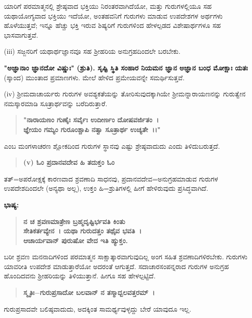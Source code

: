 ಯಾರಿಗೆ ಪರಮಾತ್ಮನಲ್ಲಿ ಶ್ರೇಷ್ಠವಾದ ಭಕ್ತಿಯು ನಿರಂತರವಾಗಿದೆಯೋ, ಮತ್ತು ಗುರುಗಳಲ್ಲಿಯೂ ಸಹ ಯಥಾಯೋಗ್ಯವಾದ ಭಕ್ತಿಯು ಇದೆಯೋ, ಅಂತಹವನಿಗೆ ಗುರುಗಳು ಮಾಡುವ ಉಪದೇಶಗಳ ಅರ್ಥಗಳು ಹೊಳೆಯುತ್ತವೆ; ಇನ್ನೂ ಹೆಚ್ಚು ಭಕ್ತಿ ಇರುವ ಶಿಷ್ಯರಿಗೆ ಗುರುಗಳಿಂದ ಹೇಳಲ್ಪಡದ ವಿಶೇಷಾರ್ಥಗಳೂ ಸಹ ಭಾಸವಾಗುತ್ತವೆ.

(iii) ಸಜ್ಜನರಿಗೆ ಯಥಾರ್ಥಜ್ಞಾನವೂ ಸಹ ಶ‍್ರೀಹರಿಯ ಅನುಗ್ರಹದಿಂದಲೇ ಬರಬೇಕು.

\textbf{"ಅಜ್ಞಾನಾಂ ಜ್ಞಾನದೋ ವಿಷ್ಣುಃ" (ಶ್ರುತಿ). ಸೃಷ್ಟಿ ಸ್ಥಿತಿ ಸಂಹಾರ ನಿಯಮನ ಜ್ಞಾನ ಅಜ್ಞಾನ ಬಂಧ ಮೋಕ್ಷಾಃ ಯತಃ} (ಸ್ಕಾಂದ) ಮುಂತಾದ ಪ್ರಮಾಣಗಳು. ಮೇಲೆ ಹೇಳಿದ ಪ್ರಮೇಯವನ್ನೇ ಸಮರ್ಥಿಸುತ್ತವೆ.

(iv) ಶ‍್ರೀಮದಾಚಾರ್ಯರು ಗುರುಗಳ ಅವಶ್ಯಕತೆಯನ್ನು ತೋರಿಸುವುದಕ್ಕಾಗಿಯೇ ಶ‍್ರೀಮನ್ನಾರಾಯಣನನ್ನು ಗುರುತ್ವೇನ ನಮಸ್ಕಾರಮಾಡಿ ಸೂತ್ರಾರ್ಥವನ್ನು ಬರೆದಿರುತ್ತಾರೆ.

\begin{verse}
\textbf{"ನಾರಾಯಣಂ ಗುಣೈಃ ಸರ್ವೈಃ ಉದೀರ್ಣಂ ದೋಷವರ್ಜಿತಂ~।}\\\textbf{ಜ್ಞೇಯಂ ಗಮ್ಯಂ ಗುರೂಂಶ್ಚಾಪಿ ನತ್ವಾ ಸೂತ್ರಾರ್ಥ ಉಚ್ಯತೇ~।।"}
\end{verse}

\noindent
ಎಂಬ ಮಂಗಳಾಚರಣ ಶ್ಲೋಕದಿಂದ ಗುರುಗಳ ಸ್ಥಾನವು ಎಷ್ಟು ಶ್ರೇಷ್ಠವಾದುದು ಎಂದು ತಿಳಿದುಬರುತ್ತದೆ.

\begin{verse}
\textbf{(v) ಓಂ ಪ್ರದಾನವದೇವ ಹಿ ತದುಕ್ತಂ ಓಂ}
\end{verse}

ತತ್=ಅಪರೋಕ್ಷಕ್ಕೆ ಕಾರಣವಾದ ಶ್ರವಣಾದಿ ಸಾಧನವು, ಪ್ರದಾನವದೇವ=ಅನುಗ್ರಹ\-ಮಾಡುವ ಗುರುಗಳ ಉಪದೇಶದಿಂದಲೇ (ಅನ್ಯಥಾ ಅಲ್ಲ), ಉಕ್ತಂ ಹಿ=ಶ್ರುತಿಗಳಲ್ಲಿ ಹೀಗೆ ಹೇಳಿರುವುದು ಪ್ರಸಿದ್ಧವಾಗಿದೆ.

\noindent
\textbf{ಭಾಷ್ಯ:\enginline{-}}

\begin{verse}
\textbf{ನ ಚ ಶ್ರವಣಮಾತ್ರೇಣ ಬ್ರಹ್ಮದೃಷ್ಟಿರ್ಭವತಿ ಕಿಂತು}\\\textbf{ಸೇತಿಕರ್ತವ್ಯೇನ~। ಯಥಾ ಗುರುದತ್ತಂ ತಥೈವ ಭವತಿ~।}\\\textbf{ಆಚಾರ್ಯವಾನ್ ಪುರುಷೋ ವೇದ ಇತಿ ಹ್ಯುಕ್ತಂ.}
\end{verse}

ಬರೀ ಶ್ರವಣ ಮನನಾದಿಗಳಿಂದ ಪರಮಾತ್ಮನ ಸಾಕ್ಷಾತ್ಕಾರವಾಗುವುದಿಲ್ಲ ಅಂಗ ಸಹಿತ ಶ್ರವಣಾದಿಗಳಿರಬೇಕು. ಗುರುಗಳು ಯಾವರೀತಿ ಉಪದೇಶ ಮಾಡುತ್ತಾರೆಯೋ ಅದರಂತೆ ಆಗುತ್ತದೆ. ಸದಾಚಾರಸಂಪನ್ನರಾದ ಗುರುಗಳ ಅನುಗ್ರಹ ಹೊಂದಿದವನು ಶ‍್ರೀಹರಿಯನ್ನು ತಿಳಿಯುತ್ತಾನೆ. ಹೀಗೂ ಸಹ ಹೇಳಲ್ಪಟ್ಟಿದೆ.

\begin{verse}
\textbf{ಸ್ಮೃತಿಃ$-$ಗುರುಪ್ರಸಾದೋ ಬಲವಾನ್ ನ ತಸ್ಮಾದ್ಬಲವತ್ತರಮ್~।}
\end{verse}

ಗುರುಪ್ರಸಾದವೇ ಬಲಿಷ್ಠವಾದುದು, ಅದಕ್ಕಿಂತ ಸಾಮರ್ಥ್ಯವುಳ್ಳದ್ದು ಬೇರೆ ಯಾವುದೂ ಇಲ್ಲ.

